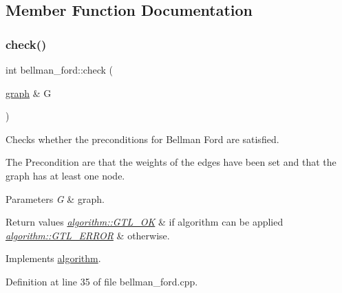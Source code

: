 \subsection{Member Function Documentation}
\mbox{\label{classbellman__ford_a9da2fb7d20ef1f726ee935474302d80b}} 
\subsubsection{\texorpdfstring{check()}{check()}}
{\footnotesize\ttfamily int bellman\+\_\+ford\+::check (\begin{DoxyParamCaption}\item[{\mbox{\hyperlink{classgraph}{graph}} \&}]{G }\end{DoxyParamCaption})\hspace{0.3cm}{\ttfamily [virtual]}}



Checks whether the preconditions for Bellman Ford are satisfied. 

The Precondition are that the weights of the edges have been set and that the graph has at least one node.


\begin{DoxyParams}{Parameters}
{\em G} & graph. \\
\hline
\end{DoxyParams}

\begin{DoxyRetVals}{Return values}
{\em \mbox{\hyperlink{classalgorithm_af1a0078e153aa99c24f9bdf0d97f6710a5114c20e4a96a76b5de9f28bf15e282b}{algorithm\+::\+G\+T\+L\+\_\+\+OK}}} & if algorithm can be applied \\
\hline
{\em \mbox{\hyperlink{classalgorithm_af1a0078e153aa99c24f9bdf0d97f6710a6fcf574690bbd6cf710837a169510dd7}{algorithm\+::\+G\+T\+L\+\_\+\+E\+R\+R\+OR}}} & otherwise. \\
\hline
\end{DoxyRetVals}


Implements \mbox{\hyperlink{classalgorithm_a76361fb03ad1cf643affc51821e43bed}{algorithm}}.



Definition at line 35 of file bellman\+\_\+ford.\+cpp.


